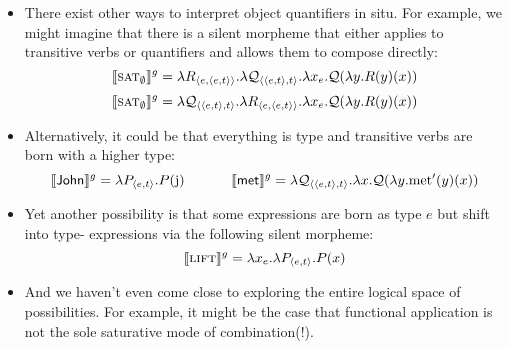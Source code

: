 \begin{itemize}
\item There exist other ways to interpret object quantifiers in situ. For example, we might imagine that there is a silent morpheme that either applies to transitive verbs or quantifiers and allows them to compose directly:%
\[\llbracket \textsc{sat}_\emptyset \rrbracket^g = \lambda R_{\langle e,\langle e,t \rangle \rangle}.\lambda {\cal Q}_{\langle \langle e,t \rangle,t \rangle}.\lambda x_e.{\cal Q}(\lambda y.R(y)(x))\]%
\[\llbracket \textsc{sat}_\emptyset \rrbracket^g = \lambda {\cal Q}_{\langle \langle e,t \rangle,t \rangle}.\lambda R_{\langle e,\langle e,t \rangle \rangle}.\lambda x_e.{\cal Q}(\lambda y.R(y)(x))\]%

\item Alternatively, it could be that everything is type  and transitive verbs are born with a higher type:%
\[\llbracket \textsf{John} \rrbracket^g = \lambda P_{\langle e,t \rangle}.P(\text{j})~~~~~~~~~~\llbracket \textsf{met} \rrbracket^g = \lambda {\cal Q}_{\langle \langle e,t \rangle,t \rangle}.\lambda x.{\cal Q}(\lambda y.\text{met}'(y)(x))\]%

\item Yet another possibility is that some expressions are born as type $e$ but shift into type- expressions via the following silent morpheme: %
\[\llbracket \textsc{lift} \rrbracket^g = \lambda x_e.\lambda P_{\langle e,t \rangle}.P(x)\]

\item And we haven't even come close to exploring the entire logical space of possibilities. For example, it might be the case that functional application is not the sole saturative mode of combination(!).%




\end{itemize}
